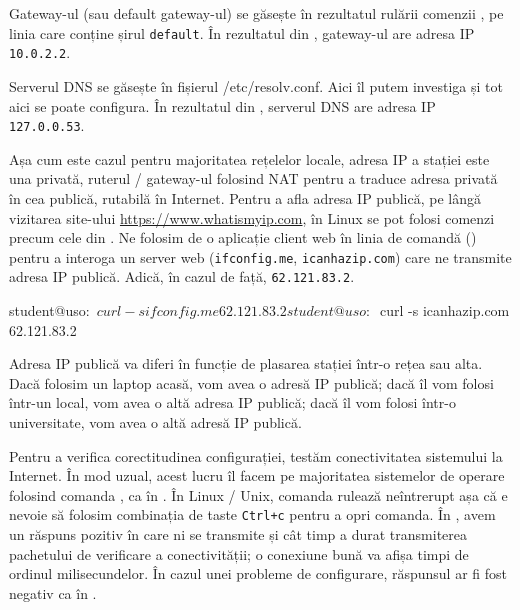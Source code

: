 Gateway-ul (sau default gateway-ul) se găsește în rezultatul rulării comenzii , pe linia care conține șirul \texttt{default}.
În rezultatul din , gateway-ul are adresa IP \texttt{10.0.2.2}.

Serverul DNS se găsește în fișierul /etc/resolv.conf.
Aici îl putem investiga și tot aici se poate configura.
În rezultatul din , serverul DNS are adresa IP \texttt{127.0.0.53}.

Așa cum este cazul pentru majoritatea rețelelor locale, adresa IP a stației este una privată, ruterul / gateway-ul folosind NAT pentru a traduce adresa privată în cea publică, rutabilă în Internet.
Pentru a afla adresa IP publică, pe lângă vizitarea site-ului \url{https://www.whatismyip.com}, în Linux se pot folosi comenzi precum cele din .
Ne folosim de o aplicație client web în linia de comandă () pentru a interoga un server web (\texttt{ifconfig.me}, \texttt{icanhazip.com}) care ne transmite adresa IP publică. Adică, în cazul de față, \texttt{62.121.83.2}.

\begin{screen}[caption={Aflarea adresei IP publice în linia de comandă},label={lst:net:show-public-address}]
student@uso:~$ curl -s ifconfig.me
62.121.83.2
student@uso:~$ curl -s icanhazip.com
62.121.83.2
\end{screen}

Adresa IP publică va diferi în funcție de plasarea stației într-o rețea sau alta.
Dacă folosim un laptop acasă, vom avea o adresă IP publică; dacă îl vom folosi într-un local, vom avea o altă adresa IP publică; dacă îl vom folosi într-o universitate, vom avea o altă adresă IP publică.

Pentru a verifica corectitudinea configurației, testăm conectivitatea sistemului la Internet.
În mod uzual, acest lucru îl facem pe majoritatea sistemelor de operare folosind comanda , ca în .
În Linux / Unix, comanda  rulează neîntrerupt așa că e nevoie să folosim combinația de taste \texttt{Ctrl+c} pentru a opri comanda.
În , avem un răspuns pozitiv în care ni se transmite și cât timp a durat transmiterea pachetului de verificare a conectivității; o conexiune bună va afișa timpi de ordinul milisecundelor.
În cazul unei probleme de configurare, răspunsul ar fi fost negativ ca în .

